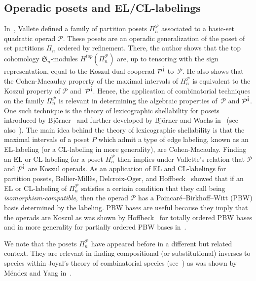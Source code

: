 \documentclass[11pt]{article}
\theoremstyle{definition}
\numberwithin{equation}{section}
\newcommand{\sym}{\mathfrak{S}}
\newcommand{\antiexcl}{\rotatebox[origin=c]{180}{!}}
\newcommand{\OP}{\mathcal{P}}
\begin{document}
 \subsection{Operadic posets and EL/CL-labelings}
In~\cite{Vallette2007},  Vallete  defined a family of partition posets $\Pi_n^{\OP}$ associated to a basic-set quadratic operad $\OP$. 
 These posets are an operadic generalization of the poset of set partitions $\Pi_n$ ordered by refinement. There, the author shows  that the top cohomology $\sym_n$-modules $H^{top}(\Pi_n^{\OP})$ are, up to tensoring with the sign representation, equal to the Koszul dual cooperad $\OP^{\antiexcl}$ to~$\OP$. He also shows that the Cohen-Macaulay property of the maximal intervals of $\Pi_n^{\OP}$ is equivalent to the Koszul property of $\OP$ and~$\OP^{\antiexcl}$. Hence, the application of combinatorial techniques on the family $\Pi_n^{\OP}$ is relevant in determining the algebraic properties of~$\OP$ and $\OP^{\antiexcl}$. One such technique is the theory of lexicographic shellability for posets introduced by Bj\"orner~\cite{Bjorner1980} and further developed by Bj\"orner and Wachs in~\cite{BjornerWachs1982, BjornerWachs1983} (see also~\cite{BjornerWachs1996,BjornerWachs1997}). The main idea behind the theory of lexicographic shellability is that the maximal intervals of a poset $P$ which admit a type of edge labeling, known as an EL-labeling (or a CL-labeling in more generality), are Cohen-Macaulay. Finding an EL or CL-labeling for a poset  $\Pi_n^{\OP}$ then implies under Vallette's relation that  $\OP$ and $\OP^{\antiexcl}$ are Koszul operads.  As an application of EL and CL-labelings for partition posets,   Bellier-Mill{\`e}s, Delcroix-Oger, and Hoffbeck~\cite{BelliermillesDelcroixogerHoffbeck2021} showed that if an EL or CL-labeling of $\Pi_n^{\OP}$ satisfies a certain condition that they call being \emph{isomorphism-compatible}, then the operad $\OP$ has a Poincar\'{e}--Birkhoff--Witt (PBW) basis determined by the labeling.  PBW bases are useful because they imply that the operads are Koszul as was shown by Hoffbeck~\cite{Hoffbeck2010} for totally ordered PBW bases and  in more generality for partially ordered PBW bases in~\cite{BelliermillesDelcroixogerHoffbeck2021}.
 
  We note that the posets $\Pi_n^{\OP}$ 
 have appeared before in a different but related context. They are relevant in finding compositional (or substitutional) inverses to species within Joyal's theory of combinatorial species (see~\cite{Joyal1981,BergeronLabelleLeroux1998}) as was shown  by M\'endez and Yang in~\cite{MendezYang1991}.  
 
\end{document}
